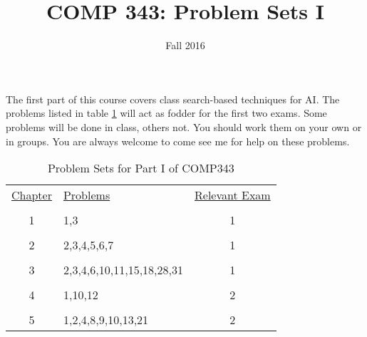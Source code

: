 \documentclass[10pt]{tufte-handout}
\title{COMP 343: Problem Sets I}
\author{  }
\date{Fall 2016}
\begin{document}
\maketitle

The first part of this course covers class search-based techniques for AI\@. The problems listed in table \ref{probs} will act as fodder for the first two exams. Some problems will be done in class, others not. You should work them on your own or in groups. You are always welcome to come see me for help on these problems. 

\begin{table}[!ht]
\begin{center}
\begin{tabular}{clc}
  \underline{Chapter} & \underline{Problems} & \underline{Relevant Exam} \\ \\
   1 & 1,3 & 1\\ \\
   2 & 2,3,4,5,6,7 & 1 \\ \\
   3 & 2,3,4,6,10,11,15,18,28,31 & 1\\ \\
   4 & 1,10,12 & 2\\ \\
   5 & 1,2,4,8,9,10,13,21 & 2
\end{tabular}
\end{center}
\caption{Problem Sets for Part I of COMP343}
\label{probs}
\end{table}
\end{document}
